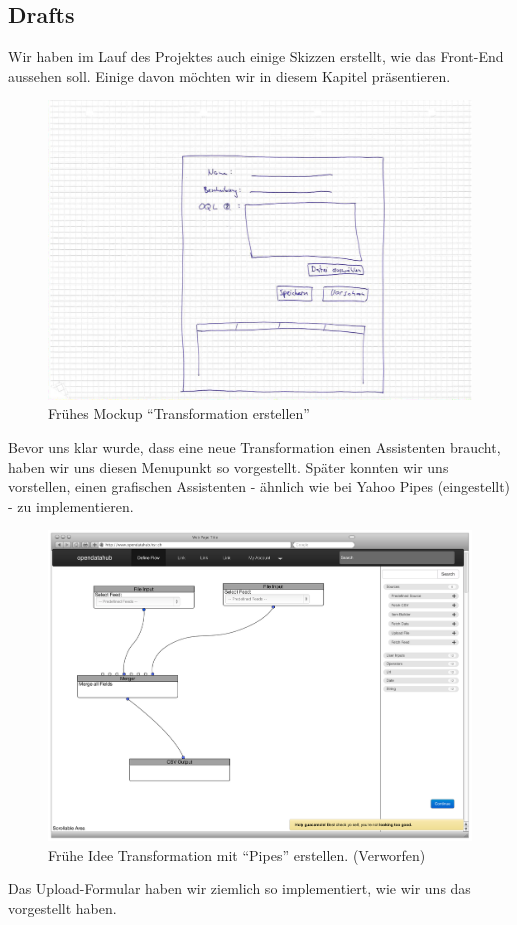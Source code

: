 \subsection{Drafts}
Wir haben im Lauf des Projektes auch einige Skizzen erstellt, wie das Front-End aussehen soll. Einige davon möchten wir in diesem Kapitel präsentieren.
\begin{figure}[H]
    \centering
    \includegraphics[width=0.6\linewidth]{fig/mockup_hcdi}
    \caption{Frühes Mockup ``Transformation erstellen''}
    \label{fig:pd:mockup-upload}
\end{figure}
Bevor uns klar wurde, dass eine neue Transformation einen Assistenten braucht, haben wir uns diesen Menupunkt so vorgestellt. Später konnten wir uns vorstellen, einen grafischen Assistenten - ähnlich wie bei Yahoo Pipes (eingestellt) - zu implementieren.
\begin{figure}[H]
    \centering
    \includegraphics[width=0.8\linewidth]{fig/Wireframes-Connectors}
    \caption{Frühe Idee Transformation mit ``Pipes'' erstellen. (Verworfen)}
    \label{fig:pd:connectors}
\end{figure}
Das Upload-Formular haben wir ziemlich so implementiert, wie wir uns das vorgestellt haben.
